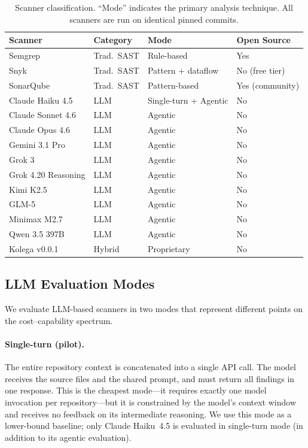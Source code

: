 \begin{table}[t]
  \caption{Scanner classification. ``Mode'' indicates the primary
    analysis technique. All scanners are run on identical pinned commits.}
  \label{tab:scanners}
  \centering
  \small
  \begin{tabular}{@{}llll@{}}
    \toprule
    \textbf{Scanner} & \textbf{Category} & \textbf{Mode} & \textbf{Open Source} \\
    \midrule
    Semgrep          & Trad.\ SAST & Rule-based        & Yes \\
    Snyk             & Trad.\ SAST & Pattern + dataflow & No (free tier) \\
    SonarQube        & Trad.\ SAST & Pattern-based     & Yes (community) \\
    \midrule
    Claude Haiku 4.5       & LLM & Single-turn + Agentic & No \\
    Claude Sonnet 4.6      & LLM & Agentic               & No \\
    Claude Opus 4.6        & LLM & Agentic               & No \\
    Gemini 3.1 Pro         & LLM & Agentic               & No \\
    Grok 3                 & LLM & Agentic               & No \\
    Grok 4.20 Reasoning    & LLM & Agentic               & No \\
    Kimi K2.5              & LLM & Agentic               & No \\
    GLM-5                  & LLM & Agentic               & No \\
    Minimax M2.7           & LLM & Agentic               & No \\
    Qwen 3.5 397B          & LLM & Agentic               & No \\
    \midrule
    Kolega v0.0.1    & Hybrid      & Proprietary       & No \\
    \bottomrule
  \end{tabular}
\end{table}

\subsection{LLM Evaluation Modes}
\label{sec:llm-modes}

We evaluate LLM-based scanners in two modes that represent different
points on the cost--capability spectrum.

\paragraph{Single-turn (pilot).}
The entire repository context is concatenated into a single API call.
The model receives the source files and the shared prompt, and must
return all findings in one response. This is the cheapest mode---it
requires exactly one model invocation per repository---but it is
constrained by the model's context window and receives no feedback
on its intermediate reasoning. We use this mode as a lower-bound
baseline; only Claude Haiku~4.5 is evaluated in single-turn mode (in
addition to its agentic evaluation).

